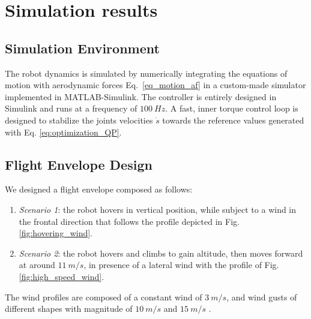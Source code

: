 \section{Simulation results}
\label{simulation}

\subsection{Simulation Environment}


The robot dynamics is simulated by numerically integrating the equations of motion with aerodynamic forces Eq.~\eqref{eq_motion_af} in a custom-made simulator implemented in MATLAB-Simulink. The controller is entirely designed in Simulink and runs at a frequency of $\SI{100}{Hz}$. A fast, inner torque control loop is designed to stabilize the joints velocities $\dot{s}$ towards the reference values generated with Eq. \eqref{eq:optimization_QP}.

\subsection{Flight Envelope Design}

We designed a flight envelope composed as follows:

\begin{enumerate}
  \item \textit{Scenario 1}: the robot hovers in vertical position, while subject to a wind in the frontal direction that follows the profile depicted in Fig. \ref{fig:hovering_wind}. 
  \item \textit{Scenario 2}: the robot hovers and climbs to gain altitude, then moves forward at around $\SI{11}{m/s}$, in presence of a lateral wind with the profile of Fig. \ref{fig:high_speed_wind}.
\end{enumerate}
%
The wind profiles are composed of a constant wind of $\SI{3}{m/s}$, and wind gusts of different shapes with magnitude of $\SI{10}{m/s}$ and $\SI{15}{m/s}$ \cite{aero,wind,KAI2019108491}. 

